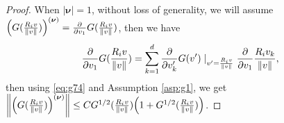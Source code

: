 \documentclass[a4paper, 11pt]{article}
\theoremstyle{plain}
\theoremstyle{remark}
\theoremstyle{definition}
\begin{document}
\begin{proof}
			When $|\boldsymbol{\nu}|=1$, without loss of generality, we will assume $\Big(G(\frac{R_i v}{\norm{v}})\Big)^{(\boldsymbol{\nu})}=\frac{\partial}{\partial v_1}G(\frac{R_i v}{\norm{v}})$, then we have
			\begin{equation}
				\frac{\partial}{\partial v_1}G(\frac{R_i v}{\norm{v}})=\sum_{k=1}^d\frac{\partial}{\partial v'_k}G(v')\mid_{v'=\frac{R_iv}{\norm{v}}}\frac{\partial}{\partial v_1}\frac{R_iv_k}{\norm{v}},
			\end{equation}
			then using \eqref{eq:g74} and Assumption \ref{asp:g1}, we get $\norm{\Big(G(\frac{R_i v}{\norm{v}})\Big)^{(\boldsymbol{\nu})}}\leq CG^{1/2}(\frac{R_i v}{\norm{v}})\Big(1+G^{1/2}(\frac{R_i v}{\norm{v}})\Big)$.
			
			
			
			
		\end{proof}
		
\end{document}
